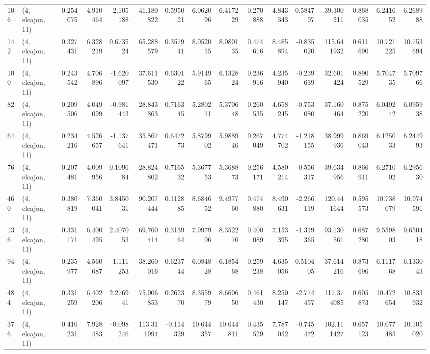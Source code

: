 \begin{tabular}{llrrrrrrrrrrrrrr}
106 &  (4, elcajon, 11) &   0.254075 &   4.910464 &  -2.105188 &    41.180822 &   0.595021 &   6.062096 &   6.417229 &  0.270888 &   4.843343 &   0.584797 &    39.300211 &   0.868035 &   6.241652 &   6.268988 \\
142 &  (4, elcajon, 11) &   0.327431 &   6.328219 &   0.673524 &    65.288579 &   0.357941 &   8.052015 &   8.080135 &  0.474616 &   8.485894 &  -0.835020 &   115.641932 &   0.611690 &  10.721225 &  10.753694 \\
100 &  (4, elcajon, 11) &   0.243542 &   4.706896 &  -1.620097 &    37.611530 &   0.630122 &   5.914965 &   6.132824 &  0.236916 &   4.235940 &  -0.239639 &    32.601424 &   0.890529 &   5.704735 &   5.709766 \\
82  &  (4, elcajon, 11) &   0.209506 &   4.049099 &  -0.981443 &    28.843863 &   0.716345 &   5.280211 &   5.370648 &  0.260535 &   4.658245 &  -0.753080 &    37.160464 &   0.875220 &   6.049242 &   6.095938 \\
64  &  (4, elcajon, 11) &   0.234216 &   4.526657 &  -1.137641 &    35.867471 &   0.647273 &   5.879902 &   5.988946 &  0.267049 &   4.774702 &  -1.218155 &    38.999936 &   0.869043 &   6.125033 &   6.244993 \\
76  &  (4, elcajon, 11) &   0.207481 &   4.009956 &   0.109684 &    28.824802 &   0.716532 &   5.367753 &   5.368873 &  0.256171 &   4.580214 &  -0.556317 &    39.634956 &   0.866911 &   6.271002 &   6.295630 \\
460 &  (4, elcajon, 11) &   0.380819 &   7.360041 &   3.845031 &    90.207444 &   0.112885 &   8.684652 &   9.497760 &  0.474880 &   8.490631 &  -2.266119 &   120.441644 &   0.595573 &  10.738079 &  10.974591 \\
136 &  (4, elcajon, 11) &   0.331171 &   6.400495 &   2.407053 &    69.760414 &   0.313964 &   7.997906 &   8.352270 &  0.400089 &   7.153395 &  -1.319365 &    93.130561 &   0.687280 &   9.559803 &   9.650418 \\
94  &  (4, elcajon, 11) &   0.235977 &   4.560687 &  -1.111253 &    38.260016 &   0.623744 &   6.084828 &   6.185468 &  0.259238 &   4.635056 &   0.510405 &    37.614216 &   0.873696 &   6.111768 &   6.133043 \\
484 &  (4, elcajon, 11) &   0.331259 &   6.402206 &   2.276941 &    75.006853 &   0.262370 &   8.355979 &   8.660650 &  0.461430 &   8.250147 &  -2.774457 &   117.374085 &   0.605873 &  10.472654 &  10.833932 \\
376 &  (4, elcajon, 11) &   0.410231 &   7.928483 &  -0.098246 &   113.311994 &  -0.114329 &  10.644357 &  10.644811 &  0.435529 &   7.787052 &  -0.745472 &   102.111427 &   0.657123 &  10.077485 &  10.105020 \\

\end{tabular}
